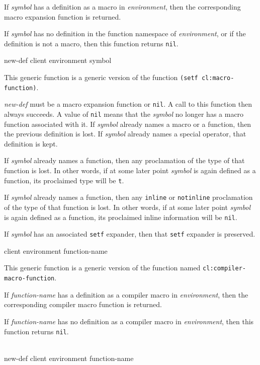 If \textit{symbol} has a definition as a macro in
\textit{environment}, then the corresponding macro expansion function
is returned.

If \textit{symbol} has no definition in the function namespace of
\textit{environment}, or if the definition is not a macro, then this
function returns \texttt{nil}.

 {new-def client environment symbol}

This generic function is a generic version of the \commonlisp{}
function \texttt{(setf cl:macro-function)}.

\textit{new-def} must be a macro expansion function or \texttt{nil}.
A call to this function then always succeeds.  A value of \texttt{nil}
means that the \textit{symbol} no longer has a macro function
associated with it.  If \textit{symbol} already names a macro or a
function, then the previous definition is lost.  If \textit{symbol}
already names a special operator, that definition is kept.

If \textit{symbol} already names a function, then any proclamation of
the type of that function is lost.  In other words, if at some later
point \textit{symbol} is again defined as a function, its proclaimed
type will be \texttt{t}.

If \textit{symbol} already names a function, then any \texttt{inline} or
\texttt{notinline} proclamation of the type of that function is lost.  In other
words, if at some later point \textit{symbol} is again defined as a
function, its proclaimed inline information will be \texttt{nil}.

If \textit{symbol} has an associated \texttt{setf} expander, then that
\texttt{setf} expander is preserved.

 {client environment function-name}

This generic function is a generic version of the \commonlisp{}
function named \texttt{cl:compiler-macro-function}.

If \textit{function-name} has a definition as a compiler macro in
\textit{environment}, then the corresponding compiler macro function
is returned.

If \textit{function-name} has no definition as a compiler macro in
\textit{environment}, then this function returns \texttt{nil}.

\\
{new-def client environment function-name}

